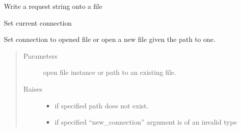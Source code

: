 \documentclass[letterpaper,10pt,english]{sphinxmanual}
\begin{document}
\begin{fulllineitems}

\begin{fulllineitems}
\label{\detokenize{dalio.external:dalio.external.file.FileWriter.request}}
Write a request string onto a file

\end{fulllineitems}


\begin{fulllineitems}
\label{\detokenize{dalio.external:dalio.external.file.FileWriter.set_connection}}
Set current connection

Set connection to opened file or open a new file given the path to
one.
\begin{quote}\begin{description}
\item[{Parameters}] \leavevmode
{} \textendash{} open file instance or path to an existing file.

\item[{Raises}] \leavevmode\begin{itemize}
\item {} 
 \textendash{} if specified path does not exist.

\item {} 
 \textendash{} if specified “new\_connection” argument is of an
    invalid type

\end{itemize}

\end{description}\end{quote}

\end{fulllineitems}


\end{fulllineitems}

\end{document}
